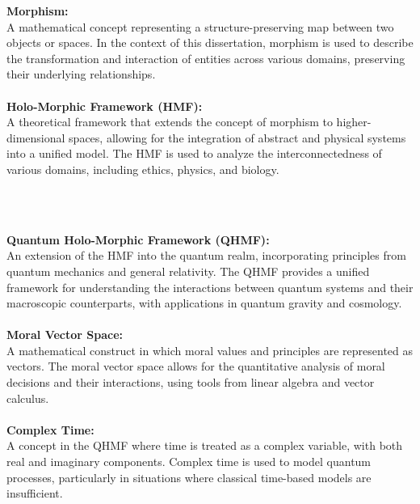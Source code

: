 \documentclass{article}
\begin{document}
\textbf{Morphism:}
\\

A mathematical concept representing a structure-preserving map between two objects or spaces. In the context of this dissertation, morphism is used to describe the transformation and interaction of entities across various domains, preserving their underlying relationships.
\\
\\

\textbf{Holo-Morphic Framework (HMF):}
\\

A theoretical framework that extends the concept of morphism to higher-dimensional spaces, allowing for the integration of abstract and physical systems into a unified model. The HMF is used to analyze the interconnectedness of various domains, including ethics, physics, and biology.
\\

\

\

\textbf{Quantum Holo-Morphic Framework (QHMF):}
\\

An extension of the HMF into the quantum realm, incorporating principles from quantum mechanics and general relativity. The QHMF provides a unified framework for understanding the interactions between quantum systems and their macroscopic counterparts, with applications in quantum gravity and cosmology.
\\
\\

\textbf{Moral Vector Space:}
\\

A mathematical construct in which moral values and principles are represented as vectors. The moral vector space allows for the quantitative analysis of moral decisions and their interactions, using tools from linear algebra and vector calculus.
\\
\\

\textbf{Complex Time:}
\\

A concept in the QHMF where time is treated as a complex variable, with both real and imaginary components. Complex time is used to model quantum processes, particularly in situations where classical time-based models are insufficient.
\\
\\
\\
\end{document}
